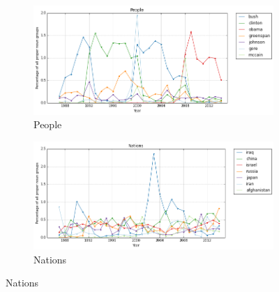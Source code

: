                   \begin{figure}%
                  \begin{subfigure}{0.48\textwidth}
                  \includegraphics[width=\linewidth]{../images/people}
                  \caption{People} \label{fig:a}
                  \end{subfigure}\hspace*{\fill}
                  \begin{subfigure}{0.48\textwidth}
                  \includegraphics[width=\linewidth]{../images/nations}
                  \caption{Nations} \label{fig:b}
                  \end{subfigure}


\end{figure}
